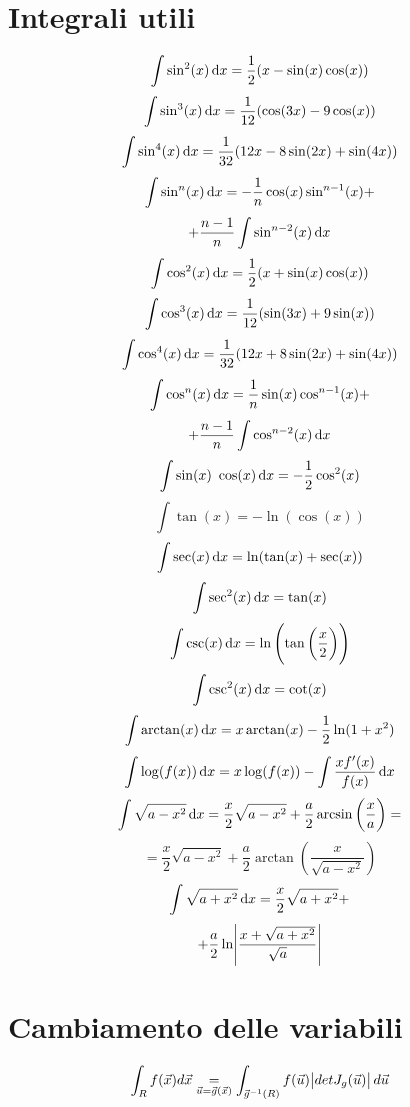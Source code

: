 \documentclass[a4paper,portrait,columns=3,5pt]{cheatsheet}
\begin{document}
\section{Integrali utili}
$$ \int \sin^2(x) \dif x = \frac{1}{2} (x - \sin(x) \cos(x)) $$
$$ \int \sin^3(x) \dif x = \frac{1}{12} (\cos(3x)-9\cos(x)) $$
$$ \int \sin^4(x) \dif x = \frac{1}{32} (12x - 8\sin(2x)+\sin(4x)) $$
$$ \int \sin^n(x) \dif x = -\frac{1}{n} \cos(x) \sin^{n-1}(x) + $$ 
$$ + \frac{n-1}{n} \int \sin^{n-2}(x) \dif x $$
$$ \int \cos^2(x) \dif x = \frac{1}{2} (x + \sin(x)\cos(x)) $$
$$ \int \cos^3(x) \dif x = \frac{1}{12} (\sin(3x) + 9\sin(x))$$
$$ \int \cos^4(x) \dif x = \frac{1}{32} (12 x + 8\sin(2x)+\sin(4x))$$
$$ \int \cos^n(x) \dif x = \frac{1}{n} \sin(x) \cos^{n-1}(x) + $$
$$ + \frac{n-1}{n} \int \cos^{n-2}(x) \dif x $$
$$ \int \sin(x) ~ \cos(x) \dif x = -\frac{1}{2} \cos^2(x) $$ 
$$ \int \tan(x) = -\ln(\cos(x)) $$
$$ \int \sec(x) \dif x = \ln (\tan(x) + \sec(x)) $$
$$ \int \sec^2(x) \dif x = \tan(x) $$
$$ \int \csc (x) \dif x = \ln \left( \tan\left(\frac{x}{2}\right)\right)$$
$$ \int \csc^2(x) \dif x = \cot(x) $$
$$ \int \arctan(x) \dif x = x \arctan(x) - \frac{1}{2} \ln (1 + x^2)$$
$$ \int \log(f(x)) \dif x = x \log (f(x)) - \int \frac{x f'(x)}{f(x)} \dif x $$
$$ \int \sqrt{a - x^2} \dif x = \frac{x}{2} \sqrt{a - x^2} + \frac{a}{2} \arcsin \left(\frac {x}{a}\right) = $$
$$ =  \frac{x}{2} \sqrt{a - x^2} + \frac{a}{2} \arctan \left(\frac{x}{\sqrt{a-x^2}}\right) $$
$$ \int \sqrt{a + x^2} \dif x =  \frac{x}{2} \sqrt{a + x^2} + $$ 
$$ + \frac{a}{2} \ln \abs{\frac{x + \sqrt{a+x^2}}{\sqrt{a}}} $$

\section{Cambiamento delle variabili}
\begin{equation*}
	\int_R f(\vec {x}) d\vec{x} \underset{{\vec{u} = \vec{g} (\vec{x})}}{=} \int_{\vec{g}^{-1}(R)} f(\vec {u}) \abs{det J_g(\vec u)} d\vec{u}
\end{equation*}
\end{document}
